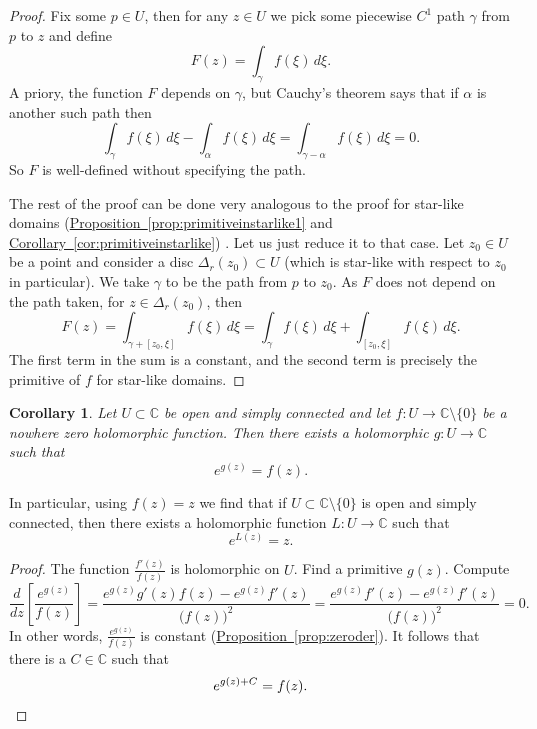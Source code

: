 \documentclass[12pt,openany]{book}
\newcommand{\C}{{\mathbb{C}}}
\theoremstyle{plain}
\newtheorem{cor}[thm]{Corollary}
\theoremstyle{remark}
\theoremstyle{definition}
\theoremstyle{exercise}
\theoremstyle{example}
\newcommand{\propref}[1]{\hyperref[#1]{Proposition~\ref*{#1}}}
\newcommand{\corref}[1]{\hyperref[#1]{Corollary~\ref*{#1}}}
\begin{document}
\begin{proof}
Fix some $p \in U$, then for any $z \in U$ we pick
some piecewise $C^1$ path $\gamma$ from $p$ to $z$
and define
\begin{equation*}
F(z) = \int_\gamma f(\xi) \, d\xi .
\end{equation*}
A priory, the function $F$ depends on $\gamma$, but Cauchy's
theorem says that if $\alpha$ is another such path then
\begin{equation*}
\int_\gamma f(\xi) \, d\xi -
\int_\alpha f(\xi) \, d\xi 
=
\int_{\gamma-\alpha} f(\xi) \, d\xi  =  0 .
\end{equation*}
So $F$ is well-defined without specifying the path.

The rest of the proof can be done very analogous to the proof for star-like
domains (\propref{prop:primitiveinstarlike1} and
\corref{cor:primitiveinstarlike}) .  Let us just reduce it to that case.
Let $z_0 \in U$ be a point and consider a disc $\Delta_r(z_0) \subset U$
(which is star-like with respect to $z_0$ in particular).
We take $\gamma$ to be the path from $p$ to $z_0$.
As $F$ does not depend on the path taken, for $z \in \Delta_r(z_0)$,
then
\begin{equation*}
F(z) =
\int_{\gamma+[z_0,\xi]} f(\xi) \, d\xi
=
\int_{\gamma} f(\xi) \, d\xi
+
\int_{[z_0,\xi]} f(\xi) \, d\xi .
\end{equation*}
The first term in the sum is a constant, and the second term is precisely
the primitive of $f$ for star-like domains.
\end{proof}

\begin{cor}
Let $U \subset \C$ be open and simply connected and
let $f \colon U \to \C \setminus \{ 0 \}$ be a nowhere zero holomorphic
function.  Then there exists a holomorphic $g \colon U \to \C$
such that
\begin{equation*}
e^{g(z)} = f(z) .
\end{equation*}
\end{cor}

In particular, using $f(z) = z$ we find that if
$U \subset \C \setminus \{ 0 \}$ is open and simply connected, then
there exists a holomorphic function $L \colon U \to \C$ such that
\begin{equation*}
e^{L(z)} = z .
\end{equation*}

\begin{proof}
The function $\frac{f'(z)}{f(z)}$ is holomorphic on $U$.
Find a primitive $g(z)$.  Compute
\begin{equation*}
\frac{d}{dz} \left[ \frac{e^{g(z)}}{f(z)} \right] =
\frac{ e^{g(z)} g'(z) f(z) - e^{g(z)} f'(z) }{{\bigl(f(z)\bigr)}^2}
=
\frac{ e^{g(z)} f'(z) - e^{g(z)} f'(z) }{{\bigl(f(z)\bigr)}^2}
=
0 .
\end{equation*}
In other words, $\frac{e^{g(z)}}{f(z)}$ is constant
(\propref{prop:zeroder}).  It follows that
there is a $C \in \C$ such that
\begin{equation*}
e^{g(z) + C} = f(z) .
\qedhere
\end{equation*}
\end{proof}
\end{document}
